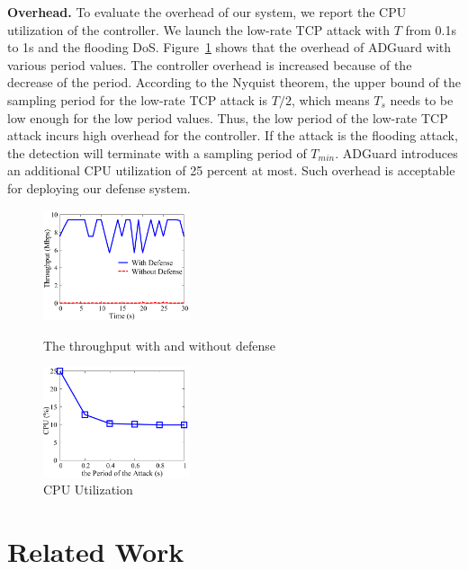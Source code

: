 \documentclass[conference]{IEEEtran}
\newcommand{\TheName}{ADGuard}
\begin{document}
\noindent \textbf{Overhead.} To evaluate the overhead of our system, we report the CPU utilization of the controller. We launch the low-rate TCP attack with $T$ from 0.1s to 1s and the flooding DoS. Figure~\ref{fig:utilizaition} shows that the overhead of \TheName{} with various period values. The controller overhead is increased because of the decrease of the period. According to the Nyquist theorem, the upper bound of the sampling period for the low-rate TCP attack is $T/2$, which means $T_s$ needs to be low enough for the low period values. Thus, the low period of the low-rate TCP attack incurs high overhead for the controller. If the attack is the flooding attack, the detection will terminate with a sampling period of $T_{min}$. \TheName{} introduces an additional CPU utilization of 25 percent at most. Such overhead is acceptable for deploying our defense system.

\begin{figure}
\begin{minipage}[t]{0.49\linewidth}
\centering
\includegraphics[width=1.7in]{Evaluation/throughput.pdf}
\caption{\small{The throughput with and without defense }}
\label{fig:throughput}
\end{minipage}
\begin{minipage}[t]{0.49\linewidth}
\centering
\includegraphics[width=1.7in]{Evaluation/utilizaition.pdf}
\caption{\small{CPU Utilization}}
\label{fig:utilizaition}
\end{minipage}
\vspace{-0.2in}
\end{figure}




\section{Related Work}
\end{document}
